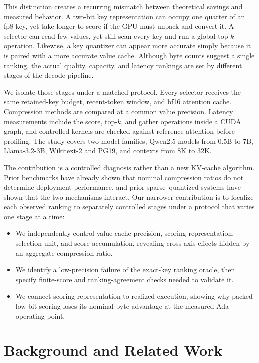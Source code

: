 \documentclass[sigplan,anonymous,review,nonacm]{acmart}
\begin{document}
This distinction creates a recurring mismatch between theoretical savings and
measured behavior. A two-bit key representation can occupy one quarter of an fp8 key,
yet take longer to score if the GPU must unpack and convert it. A selector can read
few values, yet still scan every key and run a global top-$k$ operation. Likewise, a
key quantizer can appear more accurate simply because it is paired with a more
accurate value cache. Although byte counts suggest a single ranking, the actual
quality, capacity, and latency rankings are set by different stages of the decode
pipeline.

We isolate those stages under a matched protocol. Every selector receives the same
retained-key budget, recent-token window, and bf16 attention cache. Compression
methods are compared at a common value precision. Latency measurements include the
score, top-$k$, and gather operations inside a CUDA graph, and controlled kernels are
checked against reference attention before profiling. The study covers two model
families, Qwen2.5 models from 0.5B to 7B, Llama-3.2-3B, Wikitext-2 and PG19, and
contexts from 8K to 32K.

The contribution is a controlled diagnosis rather than a new KV-cache algorithm.
Prior benchmarks have already shown that nominal compression ratios do not determine
deployment performance, and prior sparse--quantized systems have shown that the two
mechanisms interact. Our narrower contribution is to localize each observed ranking
to separately controlled stages under a protocol that varies one stage at a time:
\begin{itemize}
\setlength{\itemsep}{1pt}\setlength{\topsep}{3pt}\setlength{\leftmargin}{1.2em}
\item We independently control value-cache precision, scoring representation,
selection unit, and score accumulation, revealing cross-axis effects hidden by an
aggregate compression ratio.
\item We identify a low-precision failure of the exact-key ranking oracle,
then specify finite-score and ranking-agreement checks needed to validate it.
\item We connect scoring representation to realized execution, showing why packed
low-bit scoring loses its nominal byte advantage at the measured Ada operating point.
\end{itemize}

\section{Background and Related Work}
\end{document}
